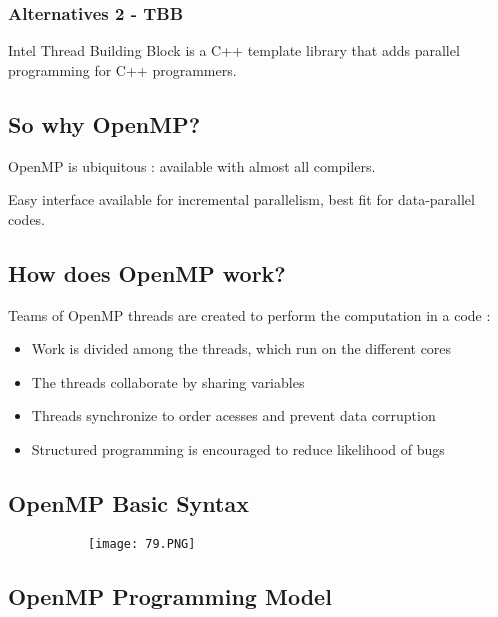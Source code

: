 \documentclass{article}
\begin{document}
\subsubsection{Alternatives 2 - TBB}

Intel Thread Building Block is a C++ template library that adds parallel programming for C++ programmers.

\subsection{So why OpenMP?}

OpenMP is ubiquitous : available with almost all compilers.

Easy interface available for incremental parallelism, best fit for data-parallel codes.

\subsection{How does OpenMP work?}

Teams of OpenMP threads are created to perform the computation in a code :

\begin{itemize}
    \item Work is divided among the threads, which run on the different cores
    \item The threads collaborate by sharing variables
    \item Threads synchronize to order acesses and prevent data corruption
    \item Structured programming is encouraged to reduce likelihood of bugs
\end{itemize}

\subsection{OpenMP Basic Syntax}

\begin{figure}[ht!]
  \centering
  \begin{subfigure}[b]{0.7\linewidth}
    \texttt{[image: 79.PNG]}
  \end{subfigure}
\end{figure}


\vspace{50mm}

\subsection{OpenMP Programming Model}
\end{document}
